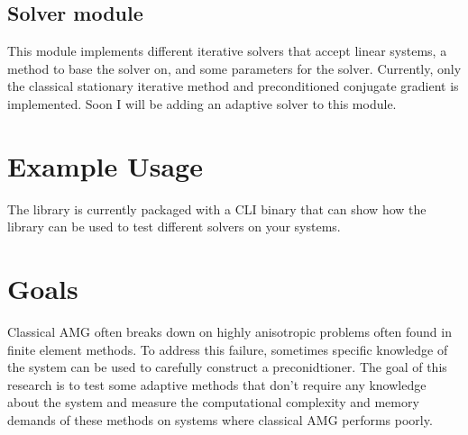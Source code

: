 \documentclass[10pt]{article}
\begin{document}
\subsection{Solver module}
This module implements different iterative solvers that accept linear systems, a
method to base the solver on, and some parameters for the solver. Currently, only
the classical stationary iterative method and preconditioned conjugate gradient is
implemented. Soon I will be adding an adaptive solver to this module.

\section{Example Usage}
The library is currently packaged with a CLI binary that can show how the library
can be used to test different solvers on your systems.

\section{Goals}
Classical AMG often breaks down on highly anisotropic problems often found in finite
element methods. To address this failure, sometimes specific knowledge of the system
can be used to carefully construct a preconidtioner. The goal of this research is to
test some adaptive methods that don't require any knowledge about the system and
measure the computational complexity and memory demands of these methods on systems
where classical AMG performs poorly.
\end{document}
